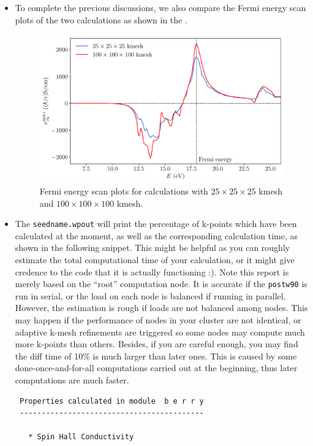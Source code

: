\begin{itemize}
\item To complete the previous discussions, we also 
compare the Fermi energy scan plots of the two calculations as 
shown in the . 
\begin{figure}[htb!]
\centering
\includegraphics[width=.8\columnwidth]{figure/example29/pt_shc_kmesh.pdf}
\caption{Fermi energy scan plots for calculations 
	with $25\times25\times25$ kmesh and $100\times100\times100$ kmesh.}
\label{fig29.3}
\end{figure}

\item The {\tt seedname.wpout} will print the percentage of k-points which 
have been calculated at the moment, as well as the corresponding calculation time, as 
shown in the following snippet. 
This might be helpful as you can roughly 
estimate the total computational time 
of your calculation, or it might give credence to the code that it is actually functioning :). 
Note this report is merely based on the ``root'' computation node. It is accurate if the {\tt postw90} is run in serial, or the load on each node is balanced if running in parallel. However, the estimation is rough if loads are not balanced among nodes. This may happen if the performance of nodes in your cluster are not identical, or adaptive k-mesh refinements are triggered so some nodes may compute much more k-points than others. 
Besides, if you are careful enough, you may find the diff time of 10\% is much larger than later ones. This 
is caused by some done-once-and-for-all computations carried out at the beginning, thus 
later computations are much faster. 
\begin{tcolorbox}[title=Pt.wpout,sharp corners,boxrule=0.5pt]
{\small
\begin{verbatim}
 Properties calculated in module  b e r r y
 ------------------------------------------

   * Spin Hall Conductivity


\end{verbatim}}
\end{tcolorbox}
\end{itemize}
